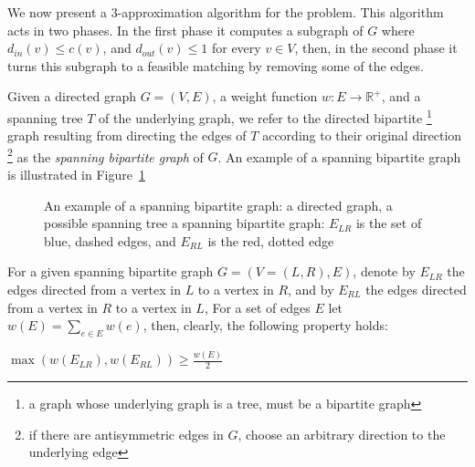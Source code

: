 \label{sub:cm}
We now present a 3-app\-roximation algorithm for the \textsc{\CARPOOL{}} problem.
This algorithm acts in two phases.
In the first phase it computes a subgraph of $G$ 
where $d_{in}(v) \leq c(v)$, and $d_{out}(v) \leq 1$ for every $v \in V$, 
then, in the second phase it turns this subgraph to a feasible matching
by removing some of the edges.

Given a directed graph $G = (V, E)$,
a weight function $w : E \rightarrow \mathbb{R^+}$, 
and a spanning tree $T$ of the underlying graph, 
we refer to the directed bipartite
\footnote{a graph whose underlying graph is a tree, must be a bipartite graph}
graph resulting from directing the edges 
of $T$ according to their original direction
\footnote{if there are antisymmetric edges in $G$, 
choose an arbitrary direction to the underlying edge}
as the \emph{spanning bipartite graph} of $G$.
An example of a spanning bipartite graph is illustrated in 
Figure~\ref{fig:spanning-bipartite-graph}

\begin{figure}
\centering

\caption{
\label{fig:spanning-bipartite-graph}
An example of a spanning bipartite graph:
 a directed graph, 
 a possible spanning tree  
 a spanning bipartite graph:
$E_{LR}$ is the set of blue, dashed edges, 
and $E_{RL}$ is the red, dotted edge   
}
\end{figure}

For a given spanning bipartite graph $G = (V = (L, R), E)$, 
denote by $E_{LR}$ the edges directed from a vertex in $L$ to a vertex in $R$,
and by $E_{RL}$ the edges directed from a vertex in $R$ to a vertex in $L$,
For a set of edges $E$ let $w(E) = \sum_{e \in E}{w(e)}$, 
then, clearly, the following property holds:

\begin{observation}
\label{ob:geq_half}
$ \max(w(E_{LR}), w(E_{RL}))  \geq \frac{w(E)}{2} $
\end{observation}


